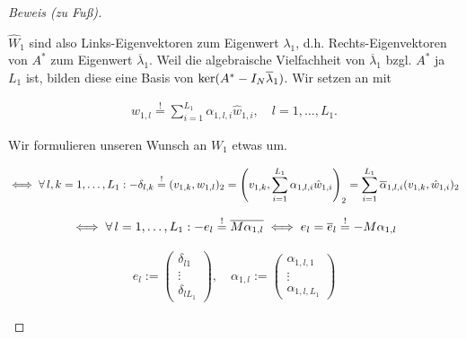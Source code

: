 \begin{proof}[Beweis (zu Fuß)]
\begin{enumerate}[label = (\roman*)]
        $\hat W_1$ sind also Links-Eigenvektoren zum Eigenwert $\lambda_1$, d.h. Rechts-Eigenvektoren von $A^\ast$ zum Eigenwert $\overline \lambda_1$.
        Weil die algebraische Vielfachheit von $\overline \lambda_1$ bzgl. $A^\ast$ ja $L_1$ ist, bilden diese eine Basis von $\operatorname{ker}(A^\ast - I_N \overline \lambda_1)$.
        Wir setzen an mit

        \begin{align*}
            w_{1, l}
            \stackrel{!}{=}
            \sum_{i=1}^{L_1}
                \alpha_{1, l, i} \hat w_{1, i},
            \quad
            l = 1, \dots, L_1.
        \end{align*}

        Wir formulieren unseren Wunsch an $W_1$ etwas um.

        \begin{align*}
            \iff
            \forall \, l, k = 1, \dots, L_1:
                -\delta_{l, k}
                \stackrel{!}{=}
                (v_{1, k}, w_{1, l})_2
                =
                {\left ( 
                    v_{1, k},
                    \sum_{i=1}^{L_1}
                        \alpha_{1, l, i} \hat w_{1, i}
                 \right )}_2
                =
                \sum_{i=1}^{L_1}
                    \overline \alpha_{1, l, i} (v_{1, k}, \hat w_{1, i})_2
        \end{align*}

        \begin{align*}
            \iff
            \forall \, l = 1, \dots, L_1:
                -e_l
                \stackrel{!}{=}
                \overline{M \alpha_{1, l}}
            \iff
                e_l
                =
                \overline e_l
                \stackrel{!}{=}
                -M \alpha_{1, l}
        \end{align*}

        \begin{align*}
            e_l
            :=
            \begin{pmatrix}
                \delta_{l 1} \\ \vdots \\ \delta_{l L_1}
            \end{pmatrix},
            \quad
            \alpha_{1, l}
            :=
            \begin{pmatrix}
                \alpha_{1, l, 1} \\ \vdots \\ \alpha_{1, l, L_1}
            \end{pmatrix}
        \end{align*}


\end{enumerate}
\end{proof}

